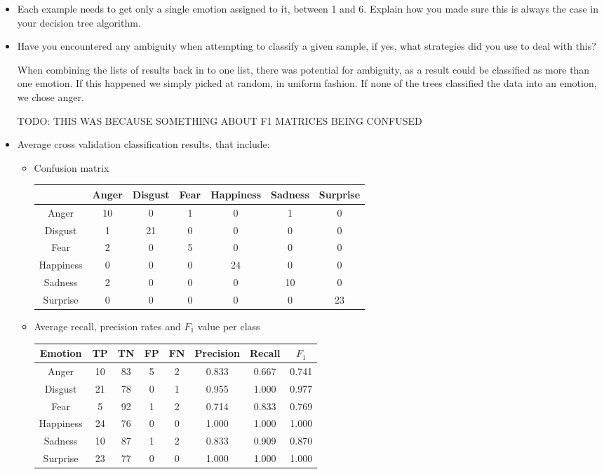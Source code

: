 \documentclass[a4paper]{article}
\begin{document}
\begin{itemize}
  \item Each example needs to get only a single emotion assigned to it, between
    1 and 6. Explain how you made sure this is always the case in your decision
    tree algorithm.



  \item Have you encountered any ambiguity when attempting to classify a given
    sample, if yes, what strategies did you use to deal with this?

    When combining the lists of results back in to one list, there was potential
    for ambiguity, as a result could be classified as more than one emotion. If
    this happened we simply picked at random, in uniform fashion. If none of the
    trees classified the data into an emotion, we chose anger.

    TODO: THIS WAS BECAUSE SOMETHING ABOUT F1 MATRICES BEING CONFUSED


  \item Average cross validation classification results, that include:
    \begin{itemize}
      \item Confusion matrix

        \begin{tabular}{c|cccccc}
          & Anger & Disgust & Fear & Happiness & Sadness & Surprise \\
          \hline
          Anger & 10 & 0 & 1 & 0 & 1 & 0 \\
        Disgust & 1 & 21 & 0 & 0 & 0 & 0 \\
           Fear & 2 & 0 & 5 & 0 & 0 & 0 \\
      Happiness & 0 & 0 & 0 & 24 & 0 & 0 \\
        Sadness & 2 & 0 & 0 & 0 & 10 & 0 \\
       Surprise & 0 & 0 & 0 & 0 & 0 & 23 \\
        \end{tabular}

      \item Average recall, precision rates and $F_1$ value per class

        \begin{tabular}{c|cccc|ccc}
          Emotion & TP & TN & FP & FN & Precision & Recall & $F_1$ \\
          \hline
          Anger & 10 & 83 & 5 & 2 & 0.833 & 0.667 & 0.741 \\
        Disgust & 21 & 78 & 0 & 1 & 0.955 & 1.000 & 0.977 \\
           Fear & 5 & 92 & 1 & 2 & 0.714 & 0.833 & 0.769 \\
      Happiness & 24 & 76 & 0 & 0 & 1.000 & 1.000 & 1.000 \\
        Sadness & 10 & 87 & 1 & 2 & 0.833 & 0.909 & 0.870 \\
       Surprise & 23 & 77 & 0 & 0 & 1.000 & 1.000 & 1.000 \\
        \end{tabular}
    \end{itemize}


\end{itemize}
\end{document}
